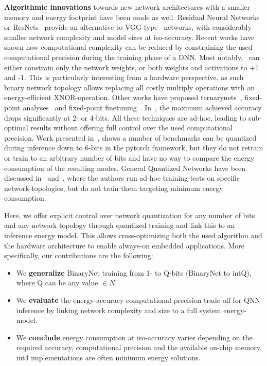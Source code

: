 \documentclass[article,10pt]{IEEEtran}
\begin{document}
\textbf{Algorithmic innovations} towards new network architectures with a smaller memory and energy footprint have been made as well. Residual Neural Networks or ResNets~\cite{he2016deep} provide an alternative to VGG-type~\cite{simonyan2014very} networks, with considerably smaller network complexity and model sizes at iso-accuracy. Recent works have shown how computational complexity can be reduced by constraining the used computational precision during the training phase of a DNN. Most notably,~\cite{hubara2016binarized} can either constrain only the network weights, or both weights and activations to +1 and -1. This is particularly interesting from a hardware perspective, as such binary network topology allows replacing all costly multiply operations with an energy-efficient XNOR-operation. Other works have proposed ternarynets~\cite{zhu2016trained}, fixed-point analyses~\cite{moons2016energy} and fixed-point finetuning~\cite{gysel2016ristretto}. In~\cite{gysel2016ristretto}, the maximum achieved accuracy drops significantly at 2- or 4-bits.  All these techniques are ad-hoc, leading to sub-optimal results without offering full control over the used computational precision. Work presented in~\cite{pytorch}, shows a number of benchmarks can be quantized during inference down to 6-bits in the pytorch framework, but they do not retrain or train to an arbitrary number of bits and have no way to compare the energy consumption of the resulting modes. General Quantized Networks have been discussed in~\cite{hubara2016quantized} and~\cite{zhou2016dorefa}, where the authors run ad-hoc training-tests on specific network-topologies, but do not train them targeting minimum energy consumption.

Here, we offer explicit control over network quantization for any number of bits and any network topology through quantized training and link this to an inference energy model. This allows cross-optimizing both the used algorithm and the hardware architecture to enable always-on embedded applications. More specifically, our contributions are the following:
\begin{itemize}
\item We \textbf{generalize} BinaryNet training from 1- to Q-bits (BinaryNet to intQ), where Q can be any value $\in N$.
\item We \textbf{evaluate} the energy-accuracy-computational precision trade-off for QNN inference by linking network complexity and size to a full system energy-model.
\item We \textbf{conclude} energy consumption at iso-accuracy varies depending on the required accuracy, computational precision and the available on-chip memory. int4 implementations are often minimum energy solutions. 
\end{itemize}
\end{document}
